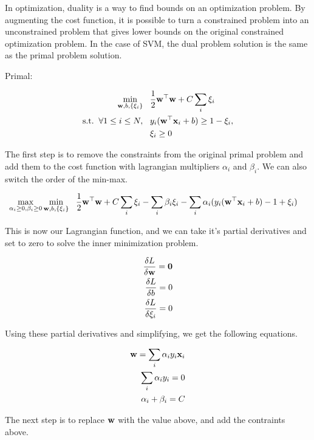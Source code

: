 \documentclass[12pt, fullpage,letterpaper]{article}
\begin{document}
\begin{enumerate}
	In optimization, duality is a way to find bounds on an optimization problem. By augmenting the cost function, it is possible to turn a constrained problem into an unconstrained problem that gives lower bounds on the original constrained optimization problem. In the case of SVM, the dual problem solution is the same as the primal problem solution. 
	
	Primal:
	
		\begin{align}
		\min\limits_{{\bf w}, b, \{\xi_i\}} &\;\;\;\frac{1}{2}{\bf w}^\top{\bf w} + C\sum_i \xi_i \nonumber\\
		\mathrm{s.t.}\;\; \forall 1 \le i \le N,&\;\;\; y_i({\bf w}^\top {\bf x}_i + b) \ge 1 - \xi_i , \nonumber \\
		&\;\;\; \xi_i \ge 0 \nonumber
		\end{align}
	
	The first step is to remove the constraints from the original primal problem and add them to the cost function with lagrangian multipliers $\alpha_i$ and $\beta_i$. We can also switch the order of the min-max.
	
		\begin{align}
		\max\limits_{\alpha_i \ge 0, \beta_i \ge 0} \min\limits_{{\bf w}, b, \{\xi_i\}}  &\;\;\;\frac{1}{2}{\bf w}^\top{\bf w} + C\sum_i \xi_i - \sum_i \beta_i \xi_i - \sum_i \alpha_i  (y_i({\bf w}^\top {\bf x}_i + b) - 1 + \xi_i) \nonumber 
		\end{align}
	
	 This is now our Lagrangian function, and we can take it's partial derivatives and set to zero to solve the inner minimization problem. 
	 
	 
		\begin{align*}
			\frac{\delta L}{\delta {\bf w}} = {\bf 0} \\ 
			\frac{\delta L}{\delta b} = 0 \\ 
			\frac{\delta L}{\delta \xi_i} = 0 
		\end{align*}
		
		Using these partial derivatives and simplifying, we get the following equations.
		
		\begin{align*}
			{\bf w} = \sum_i \alpha_i y_i {\bf x}_i \\
			\sum_i \alpha_i y_i = 0 \\
			\alpha_i + \beta_i = C
		\end{align*}
		
		The next step is to replace ${\bf w}$ with the value above, and add the contraints above. 
		

\end{enumerate}
\end{document}
